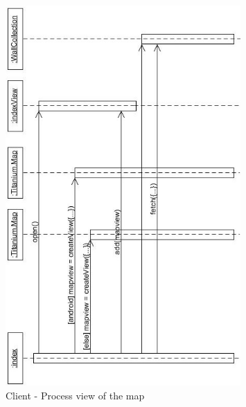 \documentclass[11pt]{book}
\begin{document}
\begin{figure}[H]
      \centering
      \includegraphics[width=0.8\textwidth]{Figures/Architecture/Sequence/client/map.jpg}
      \caption{Client - Process view of the map}
      \label{fig:arch_client_process_map}
\end{figure}
\end{document}
